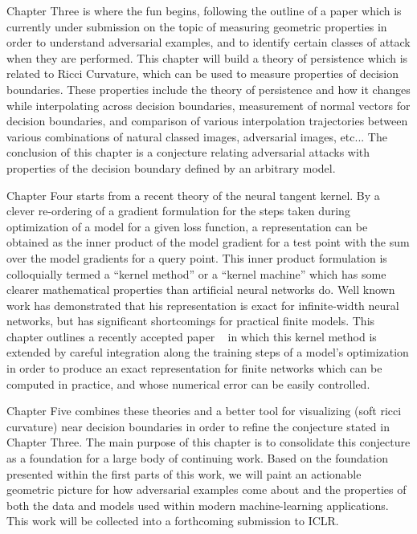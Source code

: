 Chapter Three is where the fun begins,
following the outline of a paper which is currently under submission
on the topic of measuring geometric properties in order to understand
adversarial examples, and to identify certain classes of attack when
they are performed. This chapter will build a theory of persistence
which is related to Ricci Curvature, which can be used to measure
properties of decision boundaries. These properties include the theory
of persistence and how it changes while interpolating across decision
boundaries, measurement of normal vectors for decision boundaries, and
comparison of various interpolation trajectories between various
combinations of natural classed images, adversarial images, etc... The
conclusion of this chapter is a conjecture relating adversarial
attacks with properties of the decision boundary defined by an
arbitrary model. 

Chapter Four starts
from a recent theory of the neural tangent kernel. By a clever
re-ordering of a gradient formulation for the steps taken during
optimization of a model for a given loss function, a representation
can be obtained as the inner product of the model gradient for a test
point with the sum over the model gradients for a query point. This
inner product formulation is colloquially termed a ``kernel method''
or a ``kernel machine'' which has some clearer mathematical properties
than artificial neural networks do. Well known work has demonstrated
that his representation is exact for infinite-width neural networks,
but has significant shortcomings for practical finite models. This
chapter outlines a recently accepted paper ~\citep{bell2023} in
which this kernel method is extended by careful integration along the
training steps of a model's optimization in order to produce an exact
representation for finite networks which can be computed in practice,
and whose numerical error can be easily controlled.

Chapter Five combines these theories and a better tool for
visualizing (soft ricci curvature) near decision boundaries in order
to refine the conjecture stated in Chapter Three. The main purpose of
this chapter is to consolidate this conjecture as a foundation for a
large body of continuing work. Based on the foundation presented
within the first parts of this work, we will paint an actionable
geometric picture for how adversarial examples come about and the
properties of both the data and models used within modern
machine-learning applications. This work will be collected into a
forthcoming submission to ICLR. 

